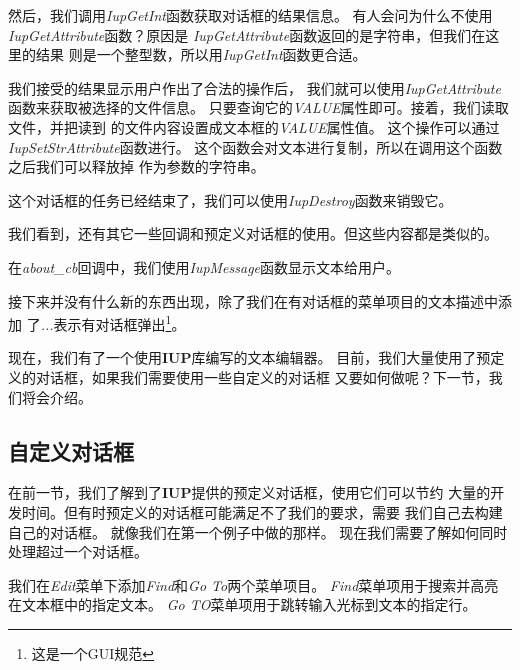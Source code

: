 \documentclass{ctexart}
\begin{document}
然后，我们调用\emph{IupGetInt}函数获取对话框的结果信息。
有人会问为什么不使用\emph{IupGetAttribute}函数？原因是
\emph{IupGetAttribute}函数返回的是字符串，但我们在这里的结果
则是一个整型数，所以用\emph{IupGetInt}函数更合适。

我们接受的结果显示用户作出了合法的操作后，
我们就可以使用\emph{IupGetAttribute}函数来获取被选择的文件信息。
只要查询它的\emph{VALUE}属性即可。接着，我们读取文件，并把读到
的文件内容设置成文本框的\emph{VALUE}属性值。
这个操作可以通过\emph{IupSetStrAttribute}函数进行。
这个函数会对文本进行复制，所以在调用这个函数之后我们可以释放掉
作为参数的字符串。

这个对话框的任务已经结束了，我们可以使用\emph{IupDestroy}函数来销毁它。

我们看到，还有其它一些回调和预定义对话框的使用。但这些内容都是类似的。

在\emph{about\_cb}回调中，我们使用\emph{IupMessage}函数显示文本给用户。

接下来并没有什么新的东西出现，除了我们在有对话框的菜单项目的文本描述中添加
了\emph{...}表示有对话框弹出\footnote{这是一个GUI规范}。

现在，我们有了一个使用\textbf{IUP}库编写的文本编辑器。
目前，我们大量使用了预定义的对话框，如果我们需要使用一些自定义的对话框
又要如何做呢？下一节，我们将会介绍。

\subsection{自定义对话框}

在前一节，我们了解到了\textbf{IUP}提供的预定义对话框，使用它们可以节约
大量的开发时间。但有时预定义的对话框可能满足不了我们的要求，需要
我们自己去构建自己的对话框。
就像我们在第一个例子中做的那样。
现在我们需要了解如何同时处理超过一个对话框。

我们在\emph{Edit}菜单下添加\emph{Find}和\emph{Go To}两个菜单项目。
\emph{Find}菜单项用于搜索并高亮在文本框中的指定文本。
\emph{Go TO}菜单项用于跳转输入光标到文本的指定行。
\end{document}
